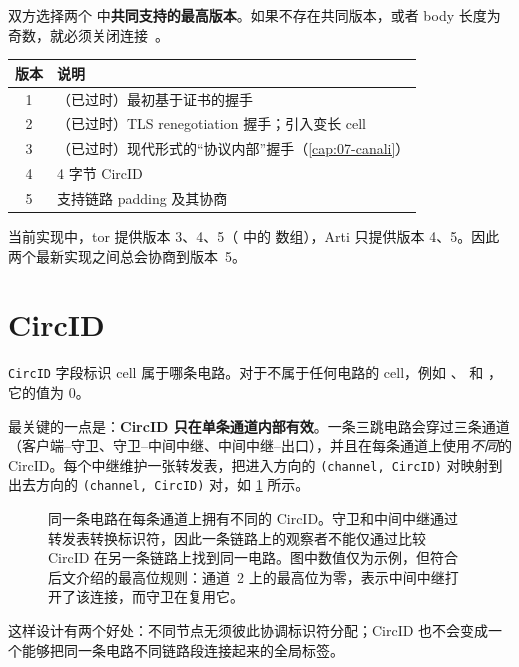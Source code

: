 双方选择两个  中\textbf{共同支持的最高版本}。如果不存在共同版本，或者 body 长度为奇数，就必须关闭连接~。

\begin{center}
\begin{tabular}{cl}
\toprule
版本 & 说明 \\
\midrule
1 & （已过时）最初基于证书的握手 \\
2 & （已过时）TLS renegotiation 握手；引入变长 cell \\
3 & （已过时）现代形式的\enquote{协议内部}握手（\cref{cap:07-canali}） \\
4 & 4 字节 CircID \\
5 & 支持链路 padding 及其协商 \\
\bottomrule
\end{tabular}
\end{center}

当前实现中，tor 提供版本 3、4、5（ 中的  数组），Arti 只提供版本 4、5。因此两个最新实现之间总会协商到版本~5。

\section{CircID}\label{sec:circid}

\texttt{CircID} 字段标识 cell 属于哪条电路。对于不属于任何电路的 cell，例如 、 和 ，它的值为 0。

最关键的一点是：\textbf{CircID 只在单条通道内部有效}。一条三跳电路会穿过三条通道（客户端--守卫、守卫--中间中继、中间中继--出口），并且在每条通道上使用\emph{不同}的 CircID。每个中继维护一张转发表，把进入方向的 \texttt{(channel, CircID)} 对映射到出去方向的 \texttt{(channel, CircID)} 对，如 \cref{fig:circid-locale} 所示。

\begin{figure}[htbp]
\centering

\caption{同一条电路在每条通道上拥有不同的 CircID。守卫和中间中继通过转发表转换标识符，因此一条链路上的观察者不能仅通过比较 CircID 在另一条链路上找到同一电路。图中数值仅为示例，但符合后文介绍的最高位规则：通道~2 上的最高位为零，表示中间中继打开了该连接，而守卫在复用它。}
\label{fig:circid-locale}
\end{figure}

这样设计有两个好处：不同节点无须彼此协调标识符分配；CircID 也不会变成一个能够把同一条电路不同链路段连接起来的全局标签。


